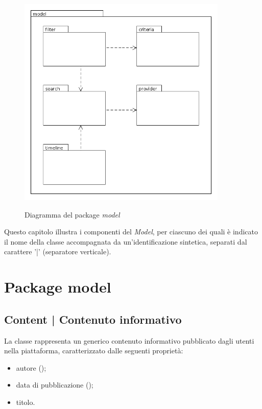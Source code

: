 \documentclass[10pt,a4paper,headinclude,footinclude,hidelinks]{scrreprt} %
\begin{document}
	\begin{figure}[ht]
		\begin{center}
	    	\includegraphics[width=10cm]{package/model.png}
			\label{gfx:package:model}
			\caption{Diagramma del package \textit{model}}
		\end{center}
	\end{figure}

	Questo capitolo illustra i componenti del \textit{Model}, per ciascuno dei quali è indicato il nome della classe accompagnata da un'identificazione sintetica, separati dal carattere '|' (separatore verticale).

	\section{Package model}
	\label{sec:stage:design:sistema:model}

	\subsection[Content]{Content | Contenuto informativo}
	\label{sec:stage:design:sistema:model:content}
	La classe rappresenta un generico contenuto informativo pubblicato dagli utenti nella piattaforma, caratterizzato dalle seguenti proprietà:
	\begin{itemize}
	\item autore (\textit{});
	\item data di pubblicazione (\textit{});
	\item titolo.
	\end{itemize}
\end{document}
